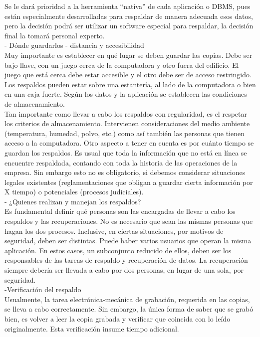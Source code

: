 \documentclass[12pt,letterpaper]{article}
\begin{document}
Se le dará prioridad a la herramienta “nativa” de cada aplicación o DBMS, pues están especialmente desarrolladas para respaldar de manera adecuada esos datos, pero la decisión podrá ser utilizar un software especial para respaldar, la decisión final la tomará personal experto. \\

-	Dónde guardarlos - distancia y accesibilidad  \\

Muy importante es establecer en qué lugar se deben guardar las copias. Debe ser bajo llave, con un juego cerca de la computadora y otro fuera del edificio. El juego que está cerca debe estar accesible y el otro debe ser de acceso restringido. Los respaldos pueden estar sobre una estantería, al lado de la computadora o bien en una caja fuerte. Según los datos y la aplicación se establecen las condiciones de almacenamiento. \\

Tan importante como llevar a cabo los respaldos con regularidad, es el respetar los criterios de almacenamiento. Intervienen consideraciones del medio ambiente (temperatura, humedad, polvo, etc.) como así también las personas que tienen acceso a la computadora.  
Otro aspecto a tener en cuenta es por cuánto tiempo se guardan los respaldos. Es usual que toda la información que no está en línea se encuentre respaldada, contando con toda la historia de las operaciones de la empresa. Sin embargo esto no es obligatorio, si debemos considerar situaciones legales existentes (reglamentaciones que obligan a guardar cierta información por X tiempo) o potenciales (procesos judiciales). \\

-	¿Quienes realizan y manejan los respaldos?\\
 
Es fundamental definir qué personas son las encargadas de llevar a cabo los respaldos y las recuperaciones. No es necesario que sean las mismas personas que hagan los dos procesos. Inclusive, en ciertas situaciones, por motivos de seguridad, deben ser distintas. Puede haber varios usuarios que operan la misma aplicación. En estos casos, un subconjunto reducido de ellos, deben ser los responsables de las tareas de respaldo y recuperación de datos. La recuperación siempre debería ser llevada a cabo por dos personas, en lugar de una sola, por seguridad.\\

-Verificación del respaldo \\
Usualmente, la tarea electrónica-mecánica de grabación, requerida en las copias, se lleva a cabo correctamente. Sin embargo, la única forma de saber que se grabó bien, es volver a leer la copia grabada y verificar que coincida con lo leído originalmente. Esta verificación insume tiempo adicional. \\
 
\end{document}

